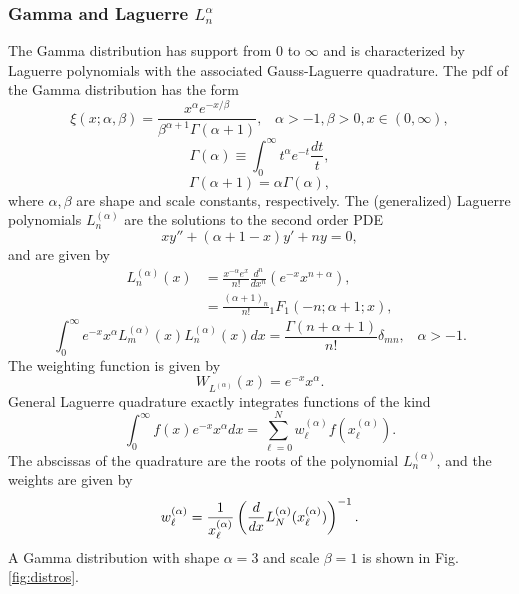 \subsubsection{Gamma and Laguerre $L_n^\alpha$}
The Gamma distribution has support from 0 to $\infty$ and is characterized by Laguerre polynomials with the associated Gauss-Laguerre quadrature.  The pdf of the Gamma distribution has the form
\begin{equation}
\xi(x;\alpha,\beta)=\frac{x^\alpha e^{-x/\beta}}{\beta^{\alpha+1}\Gamma(\alpha+1)},
    \hspace{10pt}\alpha>-1,\beta>0,x\in(0,\infty),
\end{equation}
\begin{equation}
\Gamma(\alpha)\equiv\int_0^\infty t^\alpha e^{-t}\frac{dt}{t},
\end{equation}
\begin{equation}
\Gamma(\alpha+1)=\alpha\Gamma(\alpha),
\end{equation}
where $\alpha,\beta$ are shape and scale constants, respectively.  The (generalized) Laguerre polynomials $L^{(\alpha)}_n$ are the solutions to the second order PDE
\begin{equation}
xy''+(\alpha+1-x)y'+ny=0,
\end{equation}
and are given by
\begin{align}
L^{(\alpha)}_n(x)&=\frac{x^{-\alpha}e^x}{n!}\frac{d^n}{dx^n}\left(e^{-x}x^{n+\alpha}\right),\\
  &=\frac{(\alpha+1)_n}{n!} {}_1F_1(-n;\alpha+1;x),
\end{align}
\begin{equation}
\int_0^\infty e^{-x} x^\alpha L^{(\alpha)}_m(x) L^{(\alpha)}_n(x)dx=\frac{\Gamma(n+\alpha+1)}{n!}\delta_{mn},
     \hspace{10pt}\alpha>-1.
\end{equation}
The weighting function is given by
\begin{equation}
W_{L^{(\alpha)}}(x)=e^{-x}x^\alpha.
\end{equation}
General Laguerre quadrature exactly integrates functions of the kind
\begin{equation}
\int_0^\infty  f(x)e^{-x} x^\alpha dx=\sum_{\ell=0}^N w^{(\alpha)}_\ell f(x^{(\alpha)}_\ell).
\end{equation}
The abscissas of the quadrature are the roots of the polynomial $L^{(\alpha)}_n$, and the weights are given by
\begin{equation}
w^{(\alpha)}_\ell=\frac{1}{x^{(\alpha)}_\ell}\left(\frac{d }{d x}L_N^{(\alpha)}(x^{(\alpha)}_\ell)\right)^{-1}.
\end{equation}
A Gamma distribution with shape $\alpha=3$ and scale $\beta=1$ is shown in Fig. \ref{fig:distros}.

